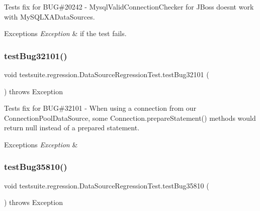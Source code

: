 Tests fix for B\+UG\#20242 -\/ Mysql\+Valid\+Connection\+Checker for J\+Boss doesn\textquotesingle{}t work with My\+S\+Q\+L\+X\+A\+Data\+Sources.


\begin{DoxyExceptions}{Exceptions}
{\em Exception} & if the test fails. \\
\hline
\end{DoxyExceptions}
\mbox{\label{classtestsuite_1_1regression_1_1_data_source_regression_test_afbc8307057c46d97d66b67f78f567cb5}} 
\subsubsection{\texorpdfstring{test\+Bug32101()}{testBug32101()}}
{\footnotesize\ttfamily void testsuite.\+regression.\+Data\+Source\+Regression\+Test.\+test\+Bug32101 (\begin{DoxyParamCaption}{ }\end{DoxyParamCaption}) throws Exception}

Tests fix for B\+UG\#32101 -\/ When using a connection from our Connection\+Pool\+Data\+Source, some Connection.\+prepare\+Statement() methods would return null instead of a prepared statement.


\begin{DoxyExceptions}{Exceptions}
{\em Exception} & \\
\hline
\end{DoxyExceptions}
\mbox{\label{classtestsuite_1_1regression_1_1_data_source_regression_test_a8decbce2b9442cfc9e96358e3b18f2a4}} 
\subsubsection{\texorpdfstring{test\+Bug35810()}{testBug35810()}}
{\footnotesize\ttfamily void testsuite.\+regression.\+Data\+Source\+Regression\+Test.\+test\+Bug35810 (\begin{DoxyParamCaption}{ }\end{DoxyParamCaption}) throws Exception}

